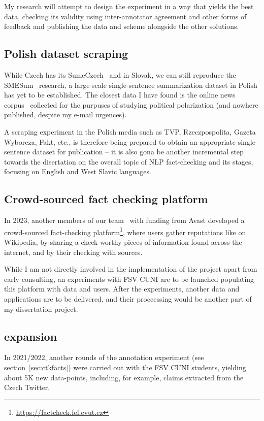 My research will attempt to design the experiment in a way that yields the best data, checking its validity using inter-annotator agreement and other forms of feedback and publishing the data and scheme alongside the other solutions.

\subsection{Polish dataset scraping}
While Czech has its SumeCzech~\cite{straka-etal-2018-sumeczech} and in Slovak, we can still reproduce the SMESum~\cite{suppa-adamec-2020-summarization} research, a large-scale single-sentence summarization dataset in Polish has yet to be established.
The closest data I have found is the online news corpus~\cite{szwoch-etal-2022-creation} collected for the purpuses of studying political polarization (and nowhere published, despite my e-mail urgences).

A scraping experiment in the Polish media such as TVP, Rzeczpospolita, Gazeta Wyborcza, Fakt, etc., is therefore being prepared to obtain an appropriate single-sentence dataset for publication -- it is also gona be another incremental step towards the disertation on the overall topic of NLP fact-checking and its stages, focusing on English and West Slavic languages. 

\subsection{Crowd-sourced fact checking platform}
In 2023, another members of our team~\cite{butora} with funding from Avast developed a crowd-sourced fact-checking platform\footnote{\url{https://factcheck.fel.cvut.cz}}, where users gather reputations like on Wikipedia, by sharing a check-worthy pieces of information found across the internet, and by their checking with sources.

While I am not directly involved in the implementation of the project apart from early consulting, an experiments with FSV CUNI are to be launched populating this platform with data and users. 
After the experiments, another data and applications are to be delivered, and their proccessing would be another part of my dissertation project.

\subsection{\CTK expansion}
In 2021/2022, another rounds of the \CTK annotation experiment (see section~\ref{sec:ctkfacts}) were carried out with the FSV CUNI students, yielding about 5K new data-points, including, for example, claims extracted from the Czech Twitter.

